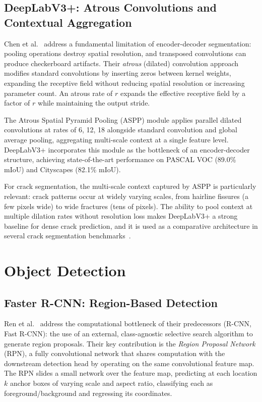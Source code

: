 \documentclass[12pt,a4paper]{article}
\begin{document}
\subsection{DeepLabV3+: Atrous Convolutions and Contextual Aggregation}

Chen et al.~\cite{chen2018deeplabv3plus} address a fundamental limitation of encoder-decoder segmentation: pooling operations destroy spatial resolution, and transposed convolutions can produce checkerboard artifacts. Their \textit{atrous} (dilated) convolution approach modifies standard convolutions by inserting zeros between kernel weights, expanding the receptive field without reducing spatial resolution or increasing parameter count. An atrous rate of $r$ expands the effective receptive field by a factor of $r$ while maintaining the output stride.

The Atrous Spatial Pyramid Pooling (ASPP) module applies parallel dilated convolutions at rates of 6, 12, 18 alongside standard convolution and global average pooling, aggregating multi-scale context at a single feature level. DeepLabV3+ incorporates this module as the bottleneck of an encoder-decoder structure, achieving state-of-the-art performance on PASCAL VOC (89.0\% mIoU) and Cityscapes (82.1\% mIoU).

For crack segmentation, the multi-scale context captured by ASPP is particularly relevant: crack patterns occur at widely varying scales, from hairline fissures (a few pixels wide) to wide fractures (tens of pixels). The ability to pool context at multiple dilation rates without resolution loss makes DeepLabV3+ a strong baseline for dense crack prediction, and it is used as a comparative architecture in several crack segmentation benchmarks~\cite{liu2019deepcrack}.

\section{Object Detection}
\label{sec:detection}

\subsection{Faster R-CNN: Region-Based Detection}

Ren et al.~\cite{ren2015faster} address the computational bottleneck of their predecessors (R-CNN, Fast R-CNN): the use of an external, class-agnostic selective search algorithm to generate region proposals. Their key contribution is the \textit{Region Proposal Network} (RPN), a fully convolutional network that shares computation with the downstream detection head by operating on the same convolutional feature map. The RPN slides a small network over the feature map, predicting at each location $k$ anchor boxes of varying scale and aspect ratio, classifying each as foreground/background and regressing its coordinates.
\end{document}
